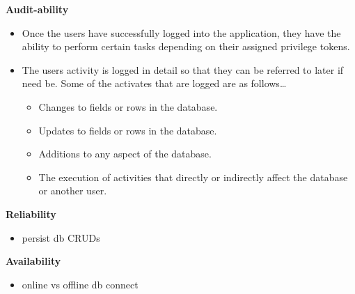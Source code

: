 \documentclass[10pt,a4paper]{article}
\begin{document}
\begin{center}\textbf{Audit-ability}\end{center}
                \begin{itemize}
                        \item  Once the users have successfully logged into the application, they have the ability to perform certain tasks depending on their assigned privilege tokens.
                        \end{itemize}
                \begin{itemize}
                        \item The users activity is logged in detail so that they can be referred to later if need be. Some of the activates that are logged are as follows…

                        \begin{itemize}
                                \item Changes to fields or rows in the database.
                        \end{itemize}
                        \begin{itemize}
                                \item Updates to fields or rows in the database.
                        \end{itemize}
                        \begin{itemize}
                                \item Additions to any aspect of the database.
                        \end{itemize}
                        \begin{itemize}
                                \item The execution of activities that directly or indirectly affect the database or another user.
                        \end{itemize}
                \end{itemize}						
                         
\begin{center}\textbf{Reliability}\end{center}           
        \begin{itemize}
                \item persist db CRUDs
        \end{itemize}   

\begin{center}\textbf{Availability}\end{center}           
        \begin{itemize}
                \item online vs offline db connect
        \end{itemize}   
                                                      
\end{document}
